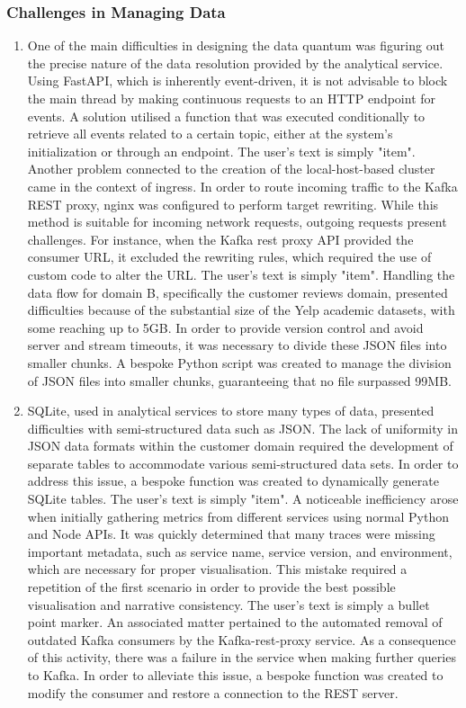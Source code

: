 \documentclass[preprint,12pt]{elsarticle}
\begin{document}
\subsubsection{Challenges in Managing Data} 
\begin{enumerate}
    \item One of the main difficulties in designing the data quantum was figuring out the precise nature of the data resolution provided by the analytical service. Using FastAPI, which is inherently event-driven, it is not advisable to block the main thread by making continuous requests to an HTTP endpoint for events. A solution utilised a function that was executed conditionally to retrieve all events related to a certain topic, either at the system's initialization or through an endpoint.
    The user's text is simply "item". Another problem connected to the creation of the local-host-based cluster came in the context of ingress. In order to route incoming traffic to the Kafka REST proxy, nginx was configured to perform target rewriting. While this method is suitable for incoming network requests, outgoing requests present challenges. For instance, when the Kafka rest proxy API provided the consumer URL, it excluded the rewriting rules, which required the use of custom code to alter the URL.
    The user's text is simply "item". Handling the data flow for domain B, specifically the customer reviews domain, presented difficulties because of the substantial size of the Yelp academic datasets, with some reaching up to 5GB. In order to provide version control and avoid server and stream timeouts, it was necessary to divide these JSON files into smaller chunks. A bespoke Python script was created to manage the division of JSON files into smaller chunks, guaranteeing that no file surpassed 99MB.
    \item SQLite, used in analytical services to store many types of data, presented difficulties with semi-structured data such as JSON. The lack of uniformity in JSON data formats within the customer domain required the development of separate tables to accommodate various semi-structured data sets. In order to address this issue, a bespoke function was created to dynamically generate SQLite tables.
    The user's text is simply "item". A noticeable inefficiency arose when initially gathering metrics from different services using normal Python and Node APIs. It was quickly determined that many traces were missing important metadata, such as service name, service version, and environment, which are necessary for proper visualisation. This mistake required a repetition of the first scenario in order to provide the best possible visualisation and narrative consistency.
    The user's text is simply a bullet point marker. An associated matter pertained to the automated removal of outdated Kafka consumers by the Kafka-rest-proxy service. As a consequence of this activity, there was a failure in the service when making further queries to Kafka. In order to alleviate this issue, a bespoke function was created to modify the consumer and restore a connection to the REST server.
\end{enumerate}
\end{document}
